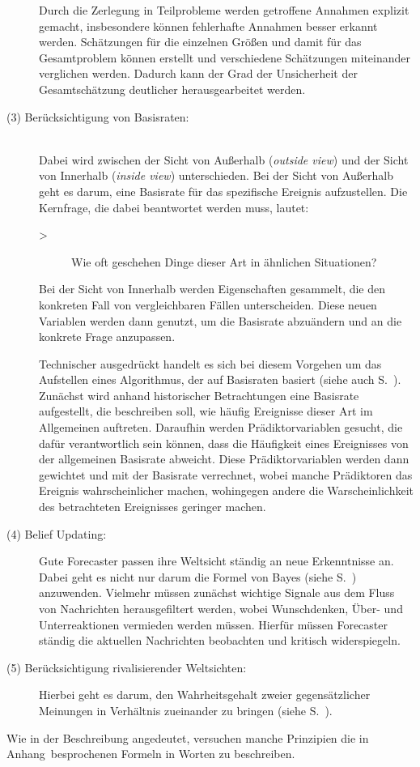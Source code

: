 \begin{description}
Durch die Zerlegung in Teilprobleme werden getroffene Annahmen explizit gemacht, insbesondere können
fehlerhafte Annahmen besser erkannt werden. Schätzungen für die einzelnen Größen und damit für das Gesamtproblem
können erstellt und verschiedene Schätzungen miteinander verglichen werden. Dadurch kann der Grad der Unsicherheit
der Gesamtschätzung deutlicher herausgearbeitet werden.

\item[(3) Berücksichtigung von Basisraten:] \hfill \\
Dabei wird zwischen der Sicht von Außerhalb (\emph{outside view}) und der Sicht von Innerhalb (\emph{inside view})
unterschieden. Bei der Sicht von Außerhalb geht es darum, eine Basisrate für das spezifische Ereignis aufzustellen.
Die Kernfrage, die dabei beantwortet werden muss, lautet:

\begin{description}
\item[>] Wie oft geschehen Dinge dieser Art in ähnlichen Situationen?
\end{description}

Bei der Sicht von Innerhalb werden Eigenschaften gesammelt, die den konkreten Fall von vergleichbaren Fällen
unterscheiden. Diese neuen Variablen werden dann genutzt, um die Basisrate abzuändern und an die konkrete
Frage anzupassen.

Technischer ausgedrückt handelt es sich bei diesem Vorgehen um das Aufstellen eines Algorithmus, der auf Basisraten
basiert (siehe auch S.~\xcom). Zunächst wird anhand historischer Betrachtungen eine Basisrate aufgestellt, die
beschreiben soll, wie häufig Ereignisse dieser Art im Allgemeinen auftreten. Daraufhin werden Prädiktorvariablen gesucht, die
dafür verantwortlich sein können, dass die Häufigkeit eines Ereignisses von der allgemeinen Basisrate abweicht. Diese
Prädiktorvariablen werden dann gewichtet und mit der Basisrate verrechnet, wobei manche Prädiktoren das Ereignis wahrscheinlicher
machen, wohingegen andere die Warscheinlichkeit des betrachteten Ereignisses geringer machen.

\item[(4) Belief Updating:]
Gute Forecaster passen ihre Weltsicht ständig an neue Erkenntnisse an. Dabei geht es nicht nur darum die Formel von Bayes
(siehe S.~\xcom) anzuwenden. Vielmehr müssen zunächst wichtige Signale aus dem Fluss von Nachrichten herausgefiltert werden, wobei
Wunschdenken, Über- und Unterreaktionen vermieden werden müssen. Hierfür müssen Forecaster ständig die aktuellen Nachrichten beobachten 
und kritisch widerspiegeln.

\item[(5) Berücksichtigung rivalisierender Weltsichten:]
Hierbei geht es darum, den Wahrheitsgehalt zweier gegensätzlicher Meinungen in Verhältnis zueinander zu bringen (siehe S.~\xcom).


\end{description}

Wie in der Beschreibung angedeutet, versuchen manche Prinzipien die in Anhang~\xcom besprochenen Formeln in Worten zu beschreiben.